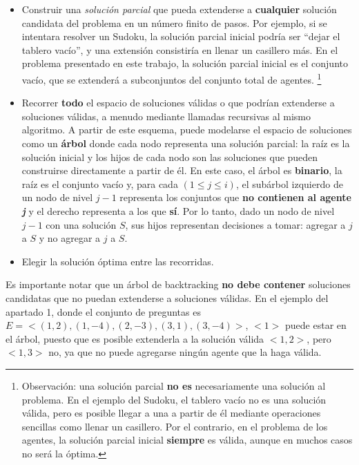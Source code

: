 \documentclass[10pt, a4paper]{article}
\begin{document}
		\begin{itemize}
		\item Construir una \textit{soluci\'on parcial} que pueda extenderse a \textbf{cualquier} soluci\'on candidata del problema en un n\'umero finito de pasos. Por ejemplo, si se intentara resolver un Sudoku, la soluci\'on parcial inicial podr\'ia ser ``dejar el tablero vac\'io'', y una extensi\'on consistir\'ia en llenar un casillero m\'as. En el problema presentado en este trabajo, la soluci\'on parcial inicial es el conjunto vac\'io, que se extender\'a a subconjuntos del conjunto total de agentes. \footnote{Observaci\'on: una soluci\'on parcial \textbf{no es} necesariamente una soluci\'on al problema. En el ejemplo del Sudoku, el tablero vac\'io no es una soluci\'on v\'alida, pero es posible llegar a una a partir de \'el mediante operaciones sencillas como llenar un casillero. Por el contrario, en el problema de los agentes, la soluci\'on parcial inicial \textbf{siempre} es v\'alida, aunque en muchos casos no ser\'a la \'optima.}
		\item Recorrer \textbf{todo} el espacio de soluciones v\'alidas o que podr\'ian extenderse a soluciones v\'alidas, a menudo mediante llamadas recursivas al mismo algoritmo. A partir de este esquema, puede modelarse el espacio de soluciones como un \textbf{\'arbol} donde cada nodo representa una soluci\'on parcial: la ra\'iz es la soluci\'on inicial y los hijos de cada nodo son las soluciones que pueden construirse directamente a partir de \'el. En este caso, el \'arbol es \textbf{binario}, la ra\'iz es el conjunto vac\'io y, para cada $(1 \leq j \leq i)$, el sub\'arbol izquierdo de un nodo de nivel $j-1$ representa los conjuntos que \textbf{no contienen al agente \textit{j}} y el derecho representa a los que \textbf{s\'i}. Por lo tanto, dado un nodo de nivel $j-1$ con una soluci\'on $S$, sus hijos representan decisiones a tomar: agregar a $j$ a $S$ y no agregar a $j$ a $S$.
		\item Elegir la soluci\'on \'optima entre las recorridas.
		\end{itemize}
		
		Es importante notar que un \'arbol de backtracking \textbf{no debe contener} soluciones candidatas que no puedan extenderse a soluciones v\'alidas. En el ejemplo del apartado 1, donde el conjunto de preguntas es $E = <(1,2), (1,-4), (2,-3), (3,1), (3,-4)>$, $<1>$ puede estar en el \'arbol, puesto que es posible extenderla a la soluci\'on v\'alida $<1, 2>$, pero $<1, 3>$ no, ya que no puede agregarse ning\'un agente que la haga v\'alida.
		
\end{document}
